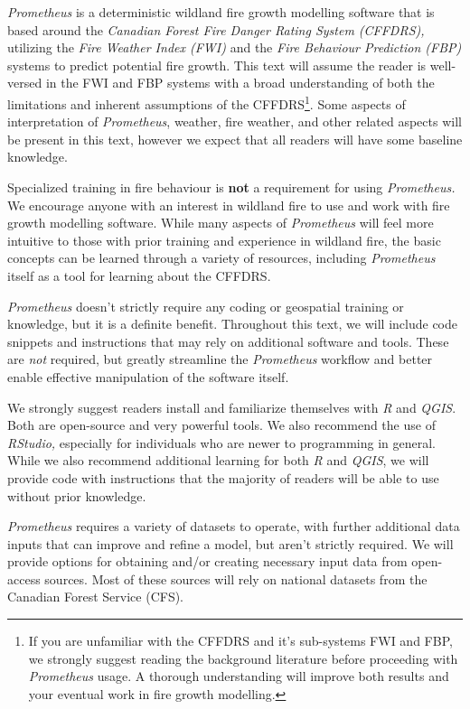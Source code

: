 \documentclass[
  letterpaper,
  DIV=11,
  numbers=noendperiod]{scrreprt}
\begin{document}
\emph{Prometheus} is a deterministic wildland fire growth modelling
software that is based around the \emph{Canadian Forest Fire Danger
Rating System (CFFDRS),} utilizing the \emph{Fire Weather Index (FWI)}
and the \emph{Fire Behaviour Prediction (FBP)} systems to predict
potential fire growth. This text will assume the reader is well-versed
in the FWI and FBP systems with a broad understanding of both the
limitations and inherent assumptions of the CFFDRS\footnote{If you are
  unfamiliar with the CFFDRS and it's sub-systems FWI and FBP, we
  strongly suggest reading the background literature before proceeding
  with \emph{Prometheus} usage. A thorough understanding will improve
  both results and your eventual work in fire growth modelling.}. Some
aspects of interpretation of \emph{Prometheus}, weather, fire weather,
and other related aspects will be present in this text, however we
expect that all readers will have some baseline knowledge.

Specialized training in fire behaviour is \textbf{not} a requirement for
using \emph{Prometheus.} We encourage anyone with an interest in
wildland fire to use and work with fire growth modelling software. While
many aspects of \emph{Prometheus} will feel more intuitive to those with
prior training and experience in wildland fire, the basic concepts can
be learned through a variety of resources, including \emph{Prometheus}
itself as a tool for learning about the CFFDRS.

\emph{Prometheus} doesn't strictly require any coding or geospatial
training or knowledge, but it is a definite benefit. Throughout this
text, we will include code snippets and instructions that may rely on
additional software and tools. These are \emph{not} required, but
greatly streamline the \emph{Prometheus} workflow and better enable
effective manipulation of the software itself.

We strongly suggest readers install and familiarize themselves with
\emph{R} and \emph{QGIS}. Both are open-source and very powerful tools.
We also recommend the use of \emph{RStudio,} especially for individuals
who are newer to programming in general. While we also recommend
additional learning for both \emph{R} and \emph{QGIS}, we will provide
code with instructions that the majority of readers will be able to use
without prior knowledge.

\emph{Prometheus} requires a variety of datasets to operate, with
further additional data inputs that can improve and refine a model, but
aren't strictly required. We will provide options for obtaining and/or
creating necessary input data from open-access sources. Most of these
sources will rely on national datasets from the Canadian Forest Service
(CFS).
\end{document}

